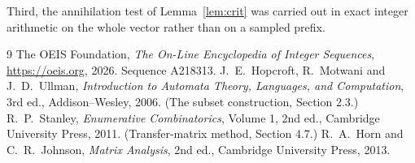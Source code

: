 \documentclass[11pt,a4paper]{article}
\theoremstyle{plain}
\theoremstyle{definition}
\begin{document}
Third, the annihilation test of Lemma~\ref{lem:crit} was carried out in exact integer
arithmetic on the whole vector rather than on a sampled prefix.

\begin{thebibliography}{9}
 The OEIS Foundation, \emph{The On-Line Encyclopedia of Integer
Sequences}, \url{https://oeis.org}, 2026. Sequence A218313.
 J.~E.~Hopcroft, R.~Motwani and J.~D.~Ullman, \emph{Introduction to Automata
Theory, Languages, and Computation}, 3rd ed., Addison--Wesley, 2006. (The subset
construction, Section 2.3.)
 R.~P.~Stanley, \emph{Enumerative Combinatorics}, Volume 1, 2nd ed.,
Cambridge University Press, 2011. (Transfer-matrix method, Section 4.7.)
 R.~A.~Horn and C.~R.~Johnson, \emph{Matrix Analysis}, 2nd ed., Cambridge
University Press, 2013.
\end{thebibliography}
\end{document}
